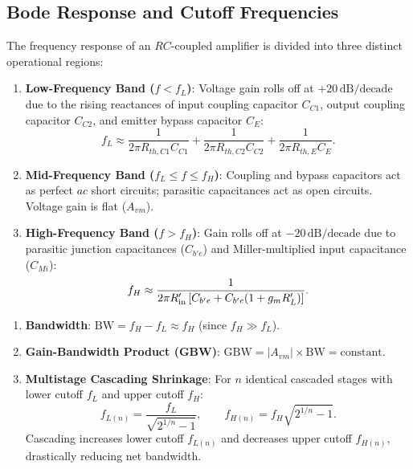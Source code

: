 \documentclass[12pt,a4paper]{article}
\begin{document}
\subsection{Bode Response and Cutoff Frequencies}
The frequency response of an $RC$-coupled amplifier is divided into three distinct operational regions:
\begin{enumerate}[leftmargin=1.5em, itemsep=2pt]
  \item \textbf{Low-Frequency Band ($f < f_L$)}: Voltage gain rolls off at $+20\,\mathrm{dB/decade}$ due to the rising reactances of input coupling capacitor $C_{C1}$, output coupling capacitor $C_{C2}$, and emitter bypass capacitor $C_E$:
  \[
  f_L \approx \frac{1}{2\pi R_{th,C1} C_{C1}} + \frac{1}{2\pi R_{th,C2} C_{C2}} + \frac{1}{2\pi R_{th,E} C_E}.
  \]
  \item \textbf{Mid-Frequency Band ($f_L \le f \le f_H$)}: Coupling and bypass capacitors act as perfect $ac$ short circuits; parasitic capacitances act as open circuits. Voltage gain is flat ($A_{vm}$).
  \item \textbf{High-Frequency Band ($f > f_H$)}: Gain rolls off at $-20\,\mathrm{dB/decade}$ due to parasitic junction capacitances ($C_{b'e}$) and Miller-multiplied input capacitance ($C_{Mi}$):
  \[
  f_H \approx \frac{1}{2\pi R_{\rm in}' \left[C_{b'e} + C_{b'c}(1 + g_m R_L')\right]}.
  \]
\end{enumerate}

\begin{tcolorbox}[formulabox, title={Bandwidth and Multistage Shrinkage Factors}]
\begin{enumerate}[leftmargin=1.5em, itemsep=2pt]
  \item \textbf{Bandwidth}: $\mathrm{BW} = f_H - f_L \approx f_H$ (since $f_H \gg f_L$).
  \item \textbf{Gain-Bandwidth Product (GBW)}: $\mathrm{GBW} = |A_{vm}| \times \mathrm{BW} = \mathrm{constant}$.
  \item \textbf{Multistage Cascading Shrinkage}: For $n$ identical cascaded stages with lower cutoff $f_L$ and upper cutoff $f_H$:
  \[
  f_{L(n)} = \frac{f_L}{\sqrt{2^{1/n} - 1}},\qquad
  f_{H(n)} = f_H \sqrt{2^{1/n} - 1}.
  \]
  Cascading increases lower cutoff $f_{L(n)}$ and decreases upper cutoff $f_{H(n)}$, drastically reducing net bandwidth.
\end{enumerate}
\end{tcolorbox}
\end{document}

